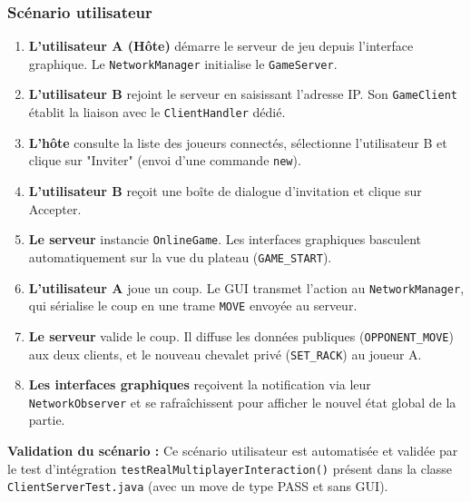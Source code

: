 \documentclass[a4paper]{article}
\begin{document}
\subsubsection{Scénario utilisateur}

\begin{enumerate}
    \item \textbf{L'utilisateur A (Hôte)} démarre le serveur de jeu depuis l'interface graphique. Le \texttt{NetworkManager} initialise le \texttt{GameServer}.
    \vspace{1mm}
    \item \textbf{L'utilisateur B} rejoint le serveur en saisissant l'adresse IP. Son \texttt{GameClient} établit la liaison avec le \texttt{ClientHandler} dédié.
    \vspace{1mm}
    \item \textbf{L'hôte} consulte la liste des joueurs connectés, sélectionne l'utilisateur B et clique sur "Inviter" (envoi d'une commande \texttt{new}).
    \vspace{1mm}
    \item \textbf{L'utilisateur B} reçoit une boîte de dialogue d'invitation et clique sur Accepter.
    \vspace{1mm}
    \item \textbf{Le serveur} instancie \texttt{OnlineGame}. Les interfaces graphiques basculent automatiquement sur la vue du plateau (\texttt{GAME\_START}).
    \vspace{1mm}
    \item \textbf{L'utilisateur A} joue un coup. Le GUI transmet l'action au \texttt{NetworkManager}, qui sérialise le coup en une trame \texttt{MOVE} envoyée au serveur.
    \vspace{1mm}
    \item \textbf{Le serveur} valide le coup. Il diffuse les données publiques (\texttt{OPPONENT\_MOVE}) aux deux clients, et le nouveau chevalet privé (\texttt{SET\_RACK}) au joueur A.
    \vspace{1mm}
    \item \textbf{Les interfaces graphiques} reçoivent la notification via leur \texttt{NetworkObserver} et se rafraîchissent pour afficher le nouvel état global de la partie.
\end{enumerate}

\begin{tcolorbox}[colback=blue!5!white,colframe=blue!75!black,title=Stratégie de validation]
\textbf{Validation du scénario :} Ce scénario utilisateur est automatisée et validée par le test d'intégration \texttt{testRealMultiplayerInteraction()} présent dans la classe \texttt{ClientServerTest.java} (avec un move de type PASS et sans GUI).
\end{tcolorbox}
\end{document}
